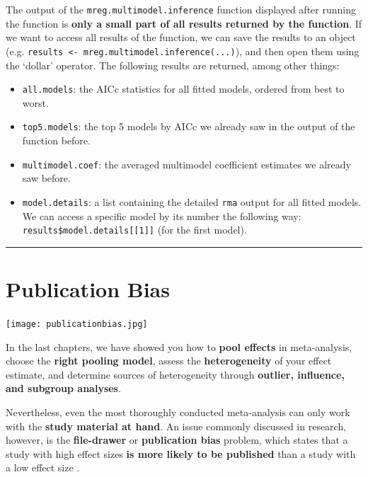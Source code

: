 \documentclass[]{book}
\providecommand{\tightlist}{%
  \setlength{\itemsep}{0pt}\setlength{\parskip}{0pt}}
\begin{document}
\begin{rmdinfo}
The output of the \texttt{mreg.multimodel.inference} function displayed
after running the function is \textbf{only a small part of all results
returned by the function}. If we want to access all results of the
function, we can save the results to an object (e.g.
\texttt{results\ \textless{}-\ mreg.multimodel.inference(...)}), and
then open them using the `dollar' operator. The following results are
returned, among other things:

\begin{itemize}
\tightlist
\item
  \texttt{all.models}: the AICc statistics for all fitted models,
  ordered from best to worst.
\item
  \texttt{top5.models}: the top 5 models by AICc we already saw in the
  output of the function before.
\item
  \texttt{multimodel.coef}: the averaged multimodel coefficient
  estimates we already saw before.
\item
  \texttt{model.details}: a list containing the detailed \texttt{rma}
  output for all fitted models. We can access a specific model by its
  number the following way: \texttt{results\$model.details{[}{[}1{]}{]}}
  (for the first model).
\end{itemize}
\end{rmdinfo}

\begin{center}\rule{0.5\linewidth}{\linethickness}\end{center}

\hypertarget{publication-bias}{%
\chapter{Publication Bias}\label{publication-bias}}

\texttt{[image: publicationbias.jpg]}

In the last chapters, we have showed you how to \textbf{pool effects} in meta-analysis, choose the \textbf{right pooling model}, assess the \textbf{heterogeneity} of your effect estimate, and determine sources of heterogeneity through \textbf{outlier, influence, and subgroup analyses}.

Nevertheless, even the most thoroughly conducted meta-analysis can only work with the \textbf{study material at hand}. An issue commonly discussed in research, however, is the \textbf{file-drawer} or \textbf{publication bias} problem, which states that a study with high effect sizes \textbf{is more likely to be published} than a study with a low effect size \citep{rothstein2006publication}.
\end{document}
